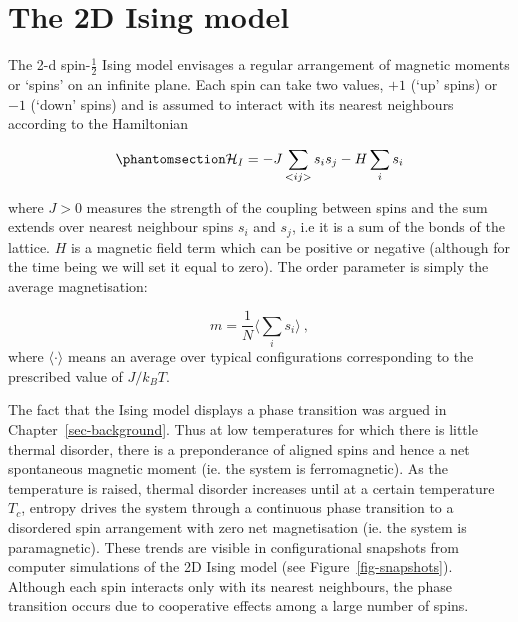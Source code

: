 \documentclass[
  letterpaper,
  DIV=11,
  numbers=noendperiod]{scrreprt}
\begin{document}
\section{The 2D Ising model}\label{the-2d-ising-model}

The 2-d spin-\(\frac{1}{2}\) Ising model envisages a regular arrangement
of magnetic moments or `spins' on an infinite plane. Each spin can take
two values, \(+1\) (`up' spins) or \(-1\) (`down' spins) and is assumed
to interact with its nearest neighbours according to the Hamiltonian

\begin{equation}\phantomsection\label{eq-ising}{
{\cal H}_I=-J\sum_{<ij>}s_is_j - H\sum_i s_i
}\end{equation}

where \(J>0\) measures the strength of the coupling between spins and
the sum extends over nearest neighbour spins \(s_i\) and \(s_j\), i.e it
is a sum of the bonds of the lattice. \(H\) is a magnetic field term
which can be positive or negative (although for the time being we will
set it equal to zero). The order parameter is simply the average
magnetisation:

\[m=\frac{1}{N} \langle \sum_i s_i \rangle\:,\] where
\(\langle\cdot\rangle\) means an average over typical configurations
corresponding to the prescribed value of \(J/k_BT\).

The fact that the Ising model displays a phase transition was argued in
Chapter~\ref{sec-background}. Thus at low temperatures for which there
is little thermal disorder, there is a preponderance of aligned spins
and hence a net spontaneous magnetic moment (ie. the system is
ferromagnetic). As the temperature is raised, thermal disorder increases
until at a certain temperature \(T_c\), entropy drives the system
through a continuous phase transition to a disordered spin arrangement
with zero net magnetisation (ie. the system is paramagnetic). These
trends are visible in configurational snapshots from computer
simulations of the 2D Ising model (see Figure~\ref{fig-snapshots}).
Although each spin interacts only with its nearest neighbours, the phase
transition occurs due to cooperative effects among a large number of
spins.
\end{document}
